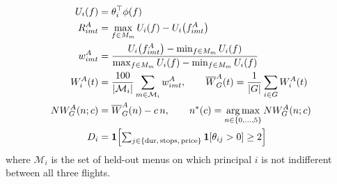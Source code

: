 \begin{align}
U_i(f) &= \theta_i^{\top}\phi(f) \label{eq:utility}\\
R^{A}_{imt} &= \max_{f \in M_m} U_i(f) - U_i\bigl(f^{A}_{imt}\bigr) \label{eq:regret}\\
w^{A}_{imt} &= \frac{U_i\bigl(f^{A}_{imt}\bigr) - \min_{f \in M_m} U_i(f)}{\max_{f \in M_m} U_i(f) - \min_{f \in M_m} U_i(f)} \label{eq:share}\\
W^{A}_{i}(t) &= \frac{100}{|\mathcal{M}_i|} \sum_{m \in \mathcal{M}_i} w^{A}_{imt},
\qquad \overline{W}^{A}_{G}(t) = \frac{1}{|G|} \sum_{i \in G} W^{A}_{i}(t) \label{eq:welfare}\\
NW^{A}_{G}(n; c) &= \overline{W}^{A}_{G}(n) - c\,n,
\qquad n^{*}(c) = \operatorname*{arg\,max}_{n \in \{0,\dots,5\}} NW^{A}_{G}(n; c) \label{eq:net}\\
D_i &= \mathbf{1}\Bigl[\textstyle\sum_{j \in \{\text{dur},\,\text{stops},\,\text{price}\}} \mathbf{1}[\theta_{ij} > 0] \geq 2\Bigr] \label{eq:unusual}
\end{align}
where $\mathcal{M}_i$ is the set of held-out menus on which principal $i$ is not indifferent between all three flights.
